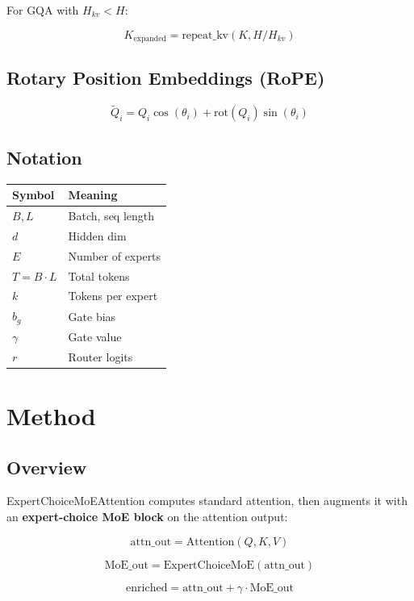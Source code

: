 For GQA with $H_{kv} < H$:

\[
K_\text{expanded} = \text{repeat\_kv}(K, H / H_{kv})
\tag{3.10}
\]

\subsection{Rotary Position Embeddings (RoPE)}

\[
\tilde{Q}_i = Q_i \cos(\theta_i) + \text{rot}(Q_i) \sin(\theta_i)
\tag{3.11}
\]

\subsection{Notation}

\begin{table}[H]
\centering
\small
\begin{tabular}{ll}
\toprule
\textbf{Symbol} & \textbf{Meaning} \\
\midrule
$B, L$ & Batch, seq length \\
$d$ & Hidden dim \\
$E$ & Number of experts \\
$T = B \cdot L$ & Total tokens \\
$k$ & Tokens per expert \\
$b_g$ & Gate bias \\
$\gamma$ & Gate value \\
$r$ & Router logits \\
\bottomrule
\end{tabular}
\end{table}



\section{Method}

\subsection{Overview}

ExpertChoiceMoEAttention computes standard attention, then augments it with 
an \textbf{expert-choice MoE block} on the attention output:

\[
\text{attn\_out} = \text{Attention}(Q, K, V)
\tag{4.1}
\]

\[
\text{MoE\_out} = \text{ExpertChoiceMoE}(\text{attn\_out})
\tag{4.2}
\]

\[
\text{enriched} = \text{attn\_out} + \gamma \cdot \text{MoE\_out}
\tag{4.3}
\]

